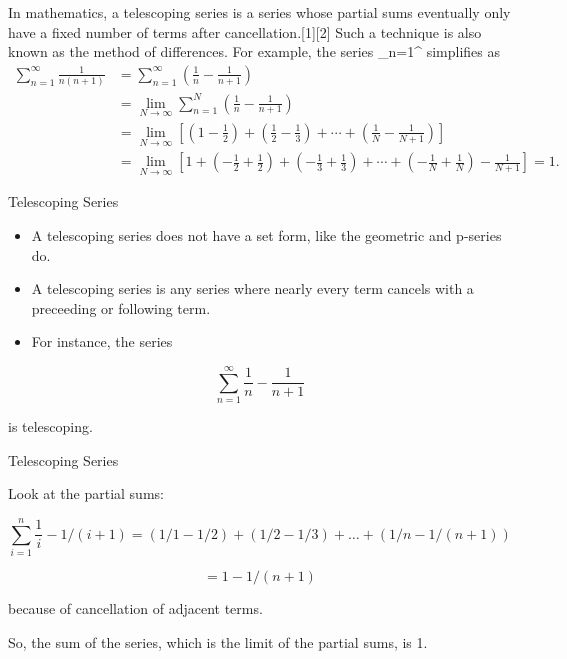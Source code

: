 In mathematics, a telescoping series is a series whose partial sums eventually only have a fixed number of terms after cancellation.[1][2] Such a technique is also known as the method of differences.
For example, the series
\sum_{n=1}^\infty{}
simplifies as
\begin{align}
\sum_{n=1}^\infty \frac{1}{n(n+1)} & {} = \sum_{n=1}^\infty \left( \frac{1}{n} - \frac{1}{n+1} \right) \\
{} & {} = \lim_{N\to\infty} \sum_{n=1}^N \left( \frac{1}{n} - \frac{1}{n+1} \right) \\
{} & {} = \lim_{N\to\infty} \left\lbrack {\left(1 - \frac{1}{2}\right) + \left(\frac{1}{2} - \frac{1}{3}\right) + \cdots + \left(\frac{1}{N} - \frac{1}{N+1}\right) } \right\rbrack  \\
{} & {} = \lim_{N\to\infty} \left\lbrack {  1 + \left( - \frac{1}{2} + \frac{1}{2}\right) + \left( - \frac{1}{3} + \frac{1}{3}\right) + \cdots + \left( - \frac{1}{N} + \frac{1}{N}\right) - \frac{1}{N+1} } \right\rbrack = 1.
\end{align}


	{Telescoping Series}
	
	
	\begin{itemize}
	\item A telescoping series does not have a set form, like the geometric and p-series do. \item A telescoping series is any series where nearly every term cancels with a preceeding or following term. \item For instance, the series
	\end{itemize}


\[   \sum^{\infty}_{n=1} \frac{1}{n} - \frac{1}{n+1} \]

is telescoping. 



	{Telescoping Series}
	
	Look at the partial sums:


\[   \sum^{n}_{i=1}  \frac{1}{i}  - 1/(i+1) = (1/1 - 1/2) + (1/2 - 1/3) + \ldots + (1/n - 1/(n+1))\]

\[= 1 - 1/(n+1)\]

because of cancellation of adjacent terms. 

So, the sum of the series, which is the limit of the partial sums, is 1.

